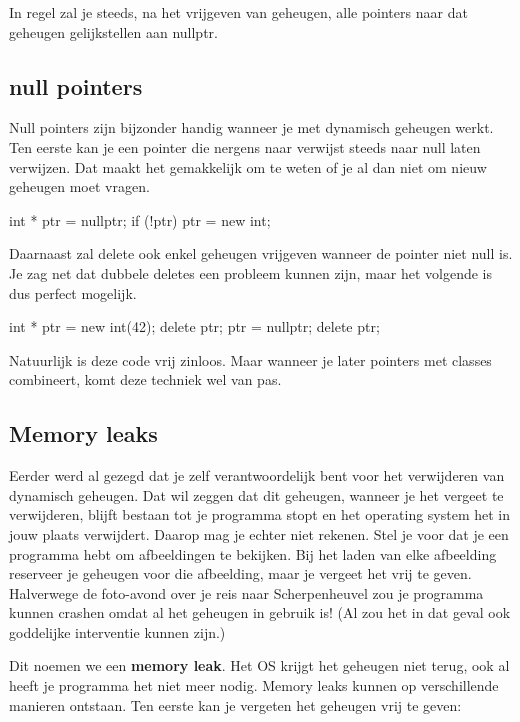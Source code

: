 \documentclass[11pt, oldfontcommands, oneside, a4paper]{memoir}
\begin{document}
In regel zal je steeds, na het vrijgeven van geheugen, alle pointers naar dat geheugen gelijkstellen aan nullptr.
 
\subsection{null pointers}
Null pointers zijn bijzonder handig wanneer je met dynamisch geheugen werkt. Ten eerste kan je een pointer die nergens naar verwijst steeds naar null laten verwijzen. Dat maakt het gemakkelijk om te weten of je al dan niet om nieuw geheugen moet vragen.

\begin{code}
int * ptr = nullptr;
if (!ptr) ptr = new int;
\end{code}

Daarnaast zal delete ook enkel geheugen vrijgeven wanneer de pointer niet null is. Je zag net dat dubbele deletes een probleem kunnen zijn, maar het volgende is dus perfect mogelijk.

\begin{code}
int * ptr = new int(42);
delete ptr;
ptr = nullptr;
delete ptr;
\end{code}

Natuurlijk is deze code vrij zinloos. Maar wanneer je later pointers met classes combineert, komt deze techniek wel van pas.

\subsection{Memory leaks}

Eerder werd al gezegd dat je zelf verantwoordelijk bent voor het verwijderen van dynamisch geheugen. Dat wil zeggen dat dit geheugen, wanneer je het vergeet te verwijderen, blijft bestaan tot je programma stopt en het operating system het in jouw plaats verwijdert. Daarop mag je echter niet rekenen. Stel je voor dat je een programma hebt om afbeeldingen te bekijken. Bij het laden van elke afbeelding reserveer je geheugen voor die afbeelding, maar je vergeet het vrij te geven. Halverwege de foto-avond over je reis naar Scherpenheuvel zou je programma kunnen crashen omdat al het geheugen in gebruik is! (Al zou het in dat geval ook goddelijke interventie kunnen zijn.)

Dit noemen we een \textbf{memory leak}. Het OS krijgt het geheugen niet terug, ook al heeft je programma het niet meer nodig. Memory leaks kunnen op verschillende manieren ontstaan. Ten eerste kan je vergeten het geheugen vrij te geven:
\end{document}
